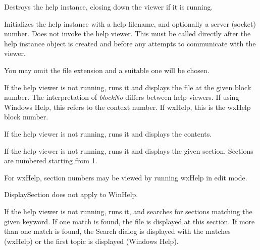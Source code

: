 Destroys the help instance, closing down the viewer if it is running.

\label{wxhelpcontrollerinitialize}



Initializes the help instance with a help filename, and optionally a server (socket)
number. Does not invoke the help viewer.
This must be called directly after the help instance object is created and before
any attempts to communicate with the viewer.

You may omit the file extension and a suitable one will be chosen.

\label{wxhelpcontrollerdisplayblock}


If the help viewer is not running, runs it and displays the file at the given block number.
The interpretation of {\it blockNo} differs between help viewers. If using Windows Help, this
refers to the context number. If wxHelp, this is the wxHelp block number.

\label{wxhelpcontrollerdisplaycontents}


If the help viewer is not running, runs it and displays the
contents.

\label{wxhelpcontrollerdisplaysection}


If the help viewer is not running, runs it and displays the given section.
Sections are numbered starting from 1.

For wxHelp, section numbers may be viewed by running wxHelp in edit mode.

DisplaySection does not apply to WinHelp.

\label{wxhelpcontrollerkeywordsearch}


If the help viewer is not running, runs it, and searches for sections matching the given keyword. If one
match is found, the file is displayed at this section. If more than one
match is found, the Search dialog is displayed with the matches (wxHelp)
or the first topic is displayed (Windows Help).

